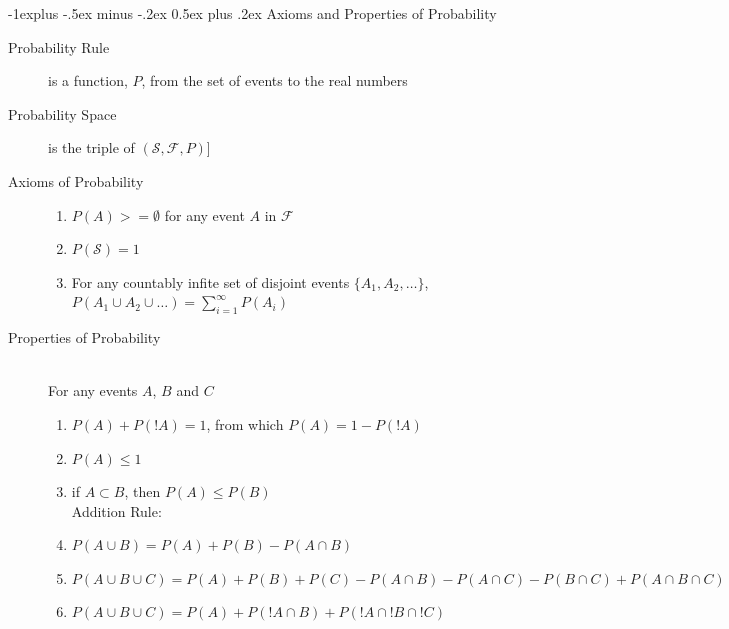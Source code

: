 \documentclass[10pt,landscape]{article}
\makeatletter
\renewcommand{\subsection}{\@startsection{subsection}{2}{0mm}%
                                {-1explus -.5ex minus -.2ex}%
                                {0.5ex plus .2ex}%
                                {\normalfont\normalsize\bfseries}}
\makeatother
\begin{document}
\begin{multicols}{3}
\subsection{Axioms and Properties of Probability}
\begin{description}
\item[Probability Rule] is a function, $P$, from the set of events to the real numbers
\item[Probability Space] is the triple of $(\mathscr{S}, \mathscr{F}, P)$]
\item[Axioms of Probability] \quad
\begin{enumerate}
    \item $P(A) >= \emptyset$ for any event $A$ in $\mathscr{F}$
    \item $P(\mathscr{S}) = 1$
    \item For any countably infite set of disjoint events $\{A_1, A_2, \dots\}$, $P(A_1 \cup A_2 \cup \dots) = \sum_{i=1}^\infty P(A_i)$
\end{enumerate}
\item[Properties of Probability] \quad \\
For any events $A$, $B$ and $C$ 
\begin{enumerate}
	\item $P(A) + P(!A) = 1$, from which $P(A) = 1 - P(!A)$
	\item $P(A) \leq 1$
	\item if $A \subset B$, then $P(A) \leq P(B)$ \\
	\vspace{5pt}
Addition Rule:
	\item $P(A \cup B) = P(A) + P(B) - P(A \cap B)$
	\item $P(A \cup B \cup C) = P(A) + P(B) + P(C) - P(A \cap B) - P(A \cap C) - P(B \cap C) + P(A \cap B \cap C)$
	\item $P(A \cup B \cup C) = P(A) + P(!A \cap B) + P(!A \cap !B \cap !C)$
\end{enumerate}
\end{description}


\end{multicols}
\end{document}
